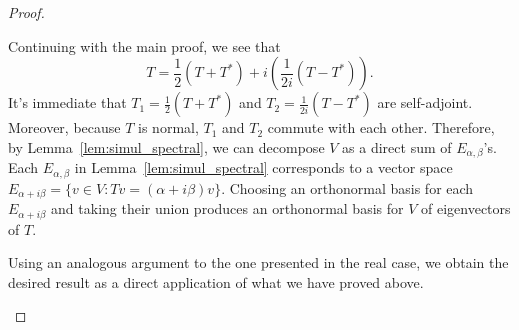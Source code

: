 \documentclass{article}
\begin{document}
\begin{proof}
\begin{description}
			Continuing with the main proof, we see that
			\[
				T = \frac{1}{2}\left( T + T^* \right) + i\left( \frac{1}{2i}\left( T -
					T^*\right) \right)
				.\]
			It's immediate that \(T_1 = \frac{1}{2}\left( T + T^* \right)\)	and \(T_2
			= \frac{1}{2i}\left( T - T^*\right)\) are self-adjoint.  Moreover,
			because \(T\) is normal, \(T_1\) and \(T_2\) commute with each other.
			Therefore, by Lemma~\ref{lem:simul_spectral}, we can decompose \(V\) as a
			direct sum of \(E_{\alpha,\beta}\)'s.  Each \(E_{\alpha,\beta}\) in
			Lemma~\ref{lem:simul_spectral} corresponds to a vector space
			\(E_{\alpha+i\beta} = \{v\in V : Tv = (\alpha + i\beta)v\}\).  Choosing
			an orthonormal basis for each \(E_{\alpha+i\beta}\) and taking their
			union produces an orthonormal basis for \(V\) of eigenvectors of \(T\).

			Using an analogous argument to the one presented in the real case, we
			obtain the desired result as a direct application of what we have proved
			above.\qedhere
	\end{description}
\end{proof}
\end{document}
